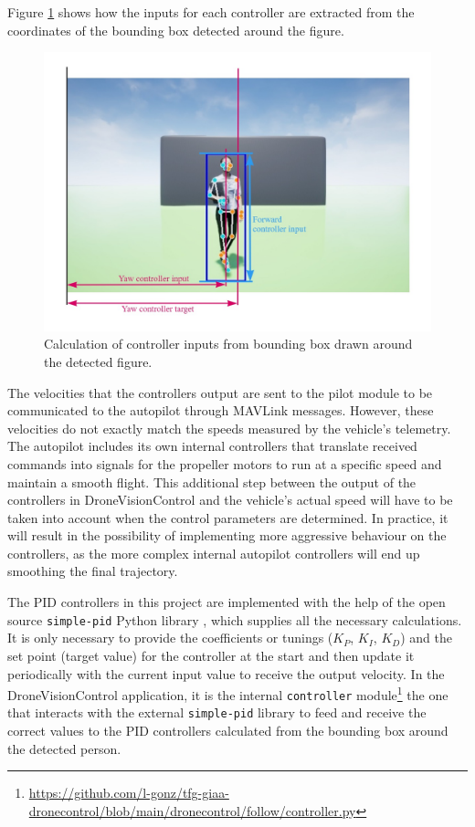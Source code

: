 Figure \ref{fig:follow-input-calcs} shows how the inputs for each controller are extracted from the coordinates of the bounding box detected around the figure.
\begin{figure}[H]
  \centering
  \includegraphics[width=\textwidth, keepaspectratio]{img/pose-calculations.jpg}
  \caption{Calculation of controller inputs from bounding box drawn around the detected figure.}
  \label{fig:follow-input-calcs}
\end{figure}

The velocities that the controllers output are sent to the pilot module to be communicated to the autopilot through MAVLink messages. However, these velocities do not exactly match the speeds measured by the vehicle's telemetry. The autopilot includes its own internal controllers that translate received commands into signals for the propeller motors to run at a specific speed and maintain a smooth flight. This additional step between the output of the controllers in DroneVisionControl and the vehicle's actual speed will have to be taken into account when the control parameters are determined. In practice, it will result in the possibility of implementing more aggressive behaviour on the controllers, as the more complex internal autopilot controllers will end up smoothing the final trajectory.

The PID controllers in this project are implemented with the help of the open source \texttt{simple-pid} Python library \cite{pid-library}, which supplies all the necessary calculations.
It is only necessary to provide the coefficients or tunings ($K_P$, $K_I$, $K_D$) and the set point (target value) for the controller at the start and then update it periodically with the current input value to receive the output velocity.
In the DroneVisionControl application, it is the internal \texttt{controller} module\footnote{\url{https://github.com/l-gonz/tfg-giaa-dronecontrol/blob/main/dronecontrol/follow/controller.py}} the one that interacts with the external \texttt{simple-pid} library to feed and receive the correct values to the PID controllers calculated from the bounding box around the detected person.

